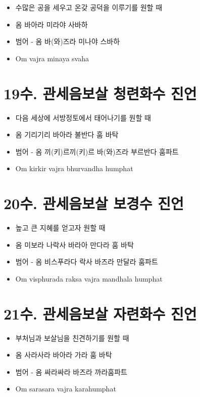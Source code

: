 \documentclass[12pt, a4paper, oneside]{book}
\let\stdsection\section
\renewcommand\section{\newpage\stdsection}
\begin{document}
			\begin{itemize}
			\item 수많은 공을 세우고 온갖 공덕을 이루기를 원할 때
			\item 옴 바아라 미라야 사바하
			\item 범어 - 옴 바(와)즈라 미나야 스바하
			\item Om vajra minaya svaha
			\end{itemize}





\section{19수. 관세음보살 청련화수 진언}

			\begin{itemize}
			\item 다음 세상에 서방정토에서 태어나기를 원할 때
			\item 옴 기리기리 바아라 불반다 훔 바탁
			\item 범어 - 옴 끼(키)르끼(키)르 바(와)즈라 부르반다 훔파트
			\item Om kirkir vajra bhurvandha humphat
			\end{itemize}





\section{20수. 관세음보살 보경수 진언}

			\begin{itemize}
			\item 높고 큰 지혜를 얻고자 원할 때
			\item 옴 미보라 나락사 바라아 만다라 훔 바탁
			\item 범어 - 옴 비스푸라다 락사 바즈라 만달라 훔파트
			\item Om visphurada raksa vajra mandhala humphat
			\end{itemize}



 


\section{21수. 관세음보살 자련화수 진언}

			\begin{itemize}
			\item 부처님과 보살님을 친견하기를 원할 때
			\item 옴 사라사라 바아라 가라 훔 바탁
			\item 범어 - 옴 싸라싸라 바즈라 까라훔파트
			\item Om sarasara vajra karahumphat
			\end{itemize}
\end{document}
